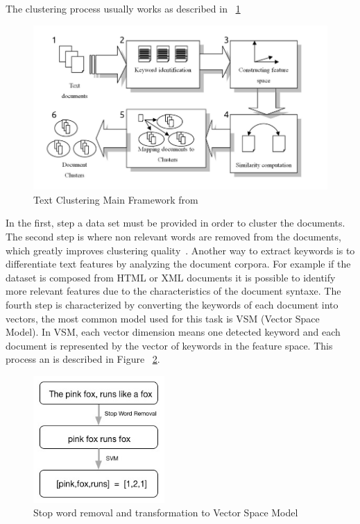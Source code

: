 The clustering process usually works as described in ~\ref{fig:1_Text_Clustering_Main_Framwork}
\begin{figure}
  \begin{center}
    \includegraphics[width=12cm]{images/1_Text_Clustering_Main_Framwork.png}
  \end{center}
  \caption{ Text Clustering Main Framework from~\citet{Dozono2012} }
  \label{fig:1_Text_Clustering_Main_Framwork}
\end{figure}
In the first, step a data set must be provided in order to cluster the documents. 
The second step is where non relevant words are removed from the documents, which greatly improves clustering quality~\cite{Kang2003}. Another way to extract keywords is to differentiate text features by analyzing the document corpora. For example if the dataset is composed from HTML or XML documents it is possible to identify more relevant features due to the characteristics of the document syntaxe.
The fourth step is characterized by converting the keywords of each document into vectors, the most common model used for this task is VSM (Vector Space Model). In VSM, each vector dimension means one detected keyword and each document is represented by the vector of keywords in the feature space. This process an is described in Figure ~\ref{fig:2_svm}.

\begin{figure}
  \begin{center}
    \includegraphics[width=5cm]{images/2_svm.jpg}
  \end{center}
  \caption{ Stop word removal and transformation to Vector Space Model }
  \label{fig:2_svm}
\end{figure}


